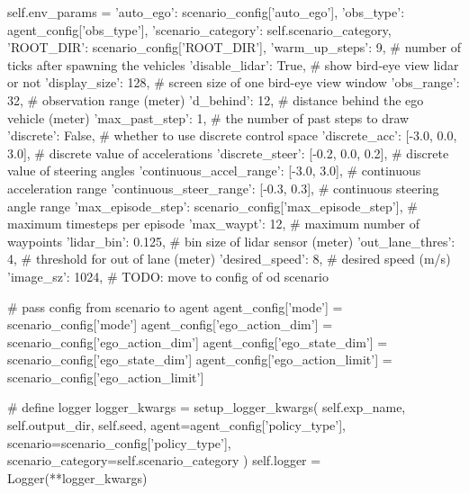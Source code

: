 \begin{appendix}
self.env\_params = {
	'auto\_ego': scenario\_config['auto\_ego'],
	'obs\_type': agent\_config['obs\_type'],
	'scenario\_category': self.scenario\_category,
	'ROOT\_DIR': scenario\_config['ROOT\_DIR'],
	'warm\_up\_steps': 9,                                        \# number of ticks after spawning the vehicles
	'disable\_lidar': True,                                     \# show bird-eye view lidar or not
	'display\_size': 128,                                       \# screen size of one bird-eye view window
	'obs\_range': 32,                                           \# observation range (meter)
	'd\_behind': 12,                                            \# distance behind the ego vehicle (meter)
	'max\_past\_step': 1,                                        \# the number of past steps to draw
	'discrete': False,                                         \# whether to use discrete control space
	'discrete\_acc': [-3.0, 0.0, 3.0],                          \# discrete value of accelerations
	'discrete\_steer': [-0.2, 0.0, 0.2],                        \# discrete value of steering angles
	'continuous\_accel\_range': [-3.0, 3.0],                     \# continuous acceleration range
	'continuous\_steer\_range': [-0.3, 0.3],                     \# continuous steering angle range
	'max\_episode\_step': scenario\_config['max\_episode\_step'],   \# maximum timesteps per episode
	'max\_waypt': 12,                                           \# maximum number of waypoints
	'lidar\_bin': 0.125,                                        \# bin size of lidar sensor (meter)
	'out\_lane\_thres': 4,                                       \# threshold for out of lane (meter)
	'desired\_speed': 8,                                        \# desired speed (m/s)
	'image\_sz': 1024,                                          \# TODO: move to config of od scenario
}


\# pass config from scenario to agent
agent\_config['mode'] = scenario\_config['mode']
agent\_config['ego\_action\_dim'] = scenario\_config['ego\_action\_dim']
agent\_config['ego\_state\_dim'] = scenario\_config['ego\_state\_dim']
agent\_config['ego\_action\_limit'] = scenario\_config['ego\_action\_limit']

\# define logger
logger\_kwargs = setup\_logger\_kwargs(
self.exp\_name, 
self.output\_dir, 
self.seed,
agent=agent\_config['policy\_type'],
scenario=scenario\_config['policy\_type'],
scenario\_category=self.scenario\_category
)
self.logger = Logger(**logger\_kwargs)


\end{appendix}
